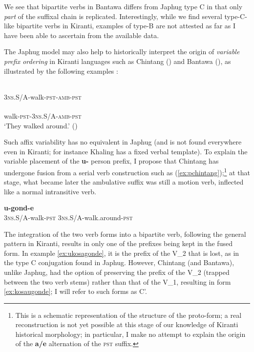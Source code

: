 \documentclass[11pt]{article}
\newcommand{\ipa}[1]{{\phon\textbf{#1}}}
\newcommand{\refb}[1]{(\ref{#1})}
\begin{document}
We see that bipartite verbs in Bantawa differs from Japhug type C in that only \textit{part} of the suffixal chain is replicated. Interestingly, while we find several type-C-like bipartite verbs in Kiranti, examples of type-B are not attested as far as I have been able to ascertain from the available data.

The Japhug model may also help to historically interpret the origin of \textit{variable prefix ordering}  in Kiranti languages such as Chintang (\citealt{bickel07chintang}) and Bantawa (\citealt[170-172]{doornenbal09}), as illustrated by the following examples :

\begin{exe}
\ex \label{ex:ukosagonde}
\gll \ipa{u-kos-a-gond-e} \\
\textsc{3ns.S/A}-walk-\textsc{pst-amb-pst} \\
\ex \label{ex:kosaugonde}
\gll \ipa{kos-a-u-gond-e} \\
walk-\textsc{pst-3ns.S/A-amb-pst} \\
\glt ‘They walked around.’ (\citealt[51]{bickel07chintang})
\end{exe}

Such affix variability has no equivalent in Japhug (and is not found everywhere even in Kiranti; for instance Khaling has a fixed verbal template). To explain the variable placement of the \ipa{u-} person prefix, I propose that Chintang has undergone  fusion from a serial verb construction such as \refb{ex:pchintang};\footnote{This is a schematic representation of the structure of the proto-form; a real reconstruction is not yet possible at this stage of our knowledge of Kiranti historical morphology; in particular, I make no attempt to explain the origin of the \ipa{a/e} alternation of the \textsc{pst} suffix. } at that stage, what became later the ambulative suffix was still a motion verb, inflected like a normal intransitive verb.

\begin{exe}
\ex \label{ex:pchintang}
\gll *\ipa{u-kos-e} \ipa{u-gond-e} \\
\textsc{3ns.S/A}-walk-\textsc{pst} \textsc{3ns.S/A}-walk.around-\textsc{pst} \\
\end{exe}


The integration of the two verb forms into a bipartite verb, following the general pattern in Kiranti, results in only one of the prefixes being kept in the fused form. In example \ref{ex:ukosagonde}, it is the prefix of the V_2 that is lost, as in the type C conjugation found in Japhug. However, Chintang (and Bantawa), unlike Japhug, had the option of preserving the prefix of the V_2 (trapped between the two verb stems) rather than that of the V_1, resulting in form \ref{ex:kosaugonde}; I will refer to such forms as C'.
\end{document}
